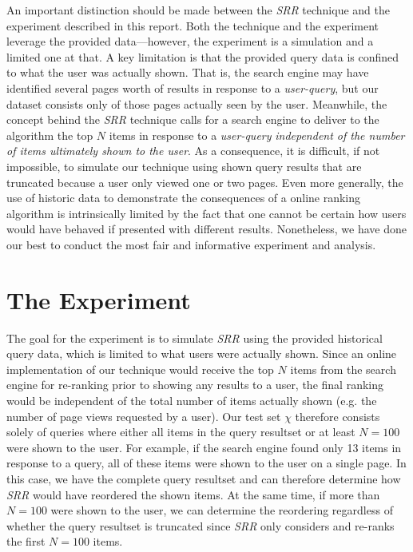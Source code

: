 \documentclass{article}
\begin{document}
An important distinction should be made between the {\em SRR}
technique and the experiment described in this report. Both the technique and
the experiment leverage the provided data---however, the experiment is
a simulation and a limited one at that. A key limitation is that the provided
query data is confined to what the user was actually shown. That is, the search
engine may have identified several pages worth of results in response to a {\em
user-query}, but our dataset consists only of those pages actually seen by the user.
Meanwhile, the concept behind the {\em SRR} technique calls for a
search engine to deliver to the algorithm the top $N$ items in response to a
{\em user-query} {\em independent of the number of items ultimately shown to the
user}. As a consequence, it is difficult, if not impossible, to simulate our
technique using shown query results that are truncated because a user only
viewed one or two pages.  Even more generally, the use of historic data to
demonstrate the consequences of a online ranking algorithm is intrinsically
limited by the fact that one cannot be certain how users would have behaved if
presented with different results. Nonetheless, we have done our best to conduct
the most fair and informative experiment and analysis.

\section{The Experiment}

The goal for the experiment is to simulate {\em SRR} using the
provided historical query data, which is limited to what users were actually
shown. Since an online implementation of our technique would receive the top $N$
items from the search engine for re-ranking prior to showing any results to a
user, the final ranking would be independent of the total number of items
actually shown (e.g. the number of page views requested by a user). Our test 
set $\chi$ therefore consists solely of queries where either all items in the
query resultset or at least $N=100$ were shown to the user. For example, if
the search engine found only 13 items in response to a query, all of these
items were shown to the user on a single page. In this case, we have the
complete query resultset and can therefore determine how {\em SRR}
would have reordered the shown items. At the same time, if more than $N=100$
were shown to the user, we can determine the reordering regardless of whether
the query resultset is truncated since {\em SRR} only considers
and re-ranks the first $N=100$ items.
\end{document}
